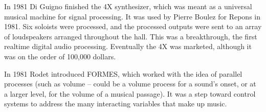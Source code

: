 In 1981 Di Guigno finished the 4X synthesizer, which was meant as a universal musical machine for signal processing. It was used by Pierre Boulez for Repons in 1981. Six soloists were processed, and the processed outputs were sent to an array of loudspeakers arranged throughout the hall. This was a breakthrough, the first realtime digital audio processing. Eventually the 4X was marketed, although it was on the order of 100,000 dollars.

In 1981 Rodet introduced FORMES, which worked with the idea of parallel processes (such as volume -- could be a volume process for a sound's onset, or at a larger level, for the volume of a musical passage). It was a step toward control systems to address the many interacting variables that make up music.

